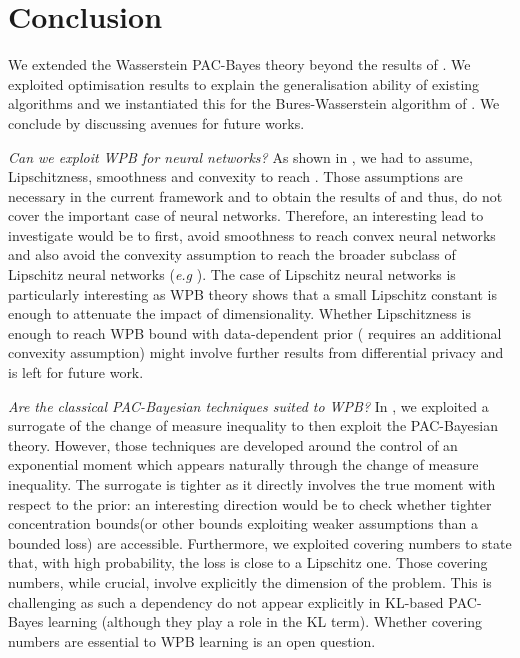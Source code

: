 \section{Conclusion}

We extended the Wasserstein PAC-Bayes theory beyond the results of \citet{amit2022integral}. We exploited optimisation results to explain the generalisation ability of existing algorithms and we instantiated this for the Bures-Wasserstein algorithm of \citet{lambert2022variational}. We conclude by discussing avenues for future works.

\textit{Can we exploit WPB for neural networks?} As shown in , we had to assume, Lipschitzness, smoothness and convexity to reach . Those assumptions are necessary in the current framework and to obtain the results of \citet{lambert2022variational} and thus, do not cover the important case of neural networks.
Therefore, an interesting lead to investigate would be to first, avoid smoothness to reach convex neural networks \citet{bengio2005convex} and also avoid the convexity assumption to reach the broader subclass of Lipschitz neural networks (\emph{e.g} \citealp{gouk2021regularisation}).
The case of Lipschitz neural networks is particularly interesting as WPB theory shows that a small Lipschitz constant is enough to attenuate the impact of dimensionality. Whether Lipschitzness is enough to reach WPB bound with data-dependent prior ( requires an additional convexity assumption) might involve further results from differential privacy and is left for future work.

\textit{Are the classical PAC-Bayesian techniques suited to WPB?} In , we exploited a surrogate of the change of measure inequality to then exploit the PAC-Bayesian theory. However, those techniques are developed around the control of an exponential moment which appears naturally through the change of measure inequality. The surrogate is tighter as it directly involves the true moment with respect to the prior: an interesting direction would be to check whether tighter concentration bounds(or other bounds exploiting weaker assumptions than a bounded loss) are accessible. Furthermore, we exploited covering numbers to state that, with high probability, the loss is close to a Lipschitz one. Those covering numbers, while crucial, involve explicitly the dimension of the problem. This is challenging as such a dependency do not appear explicitly in KL-based PAC-Bayes learning (although they play a role in the KL term). Whether covering numbers are essential to WPB learning is an open question.


